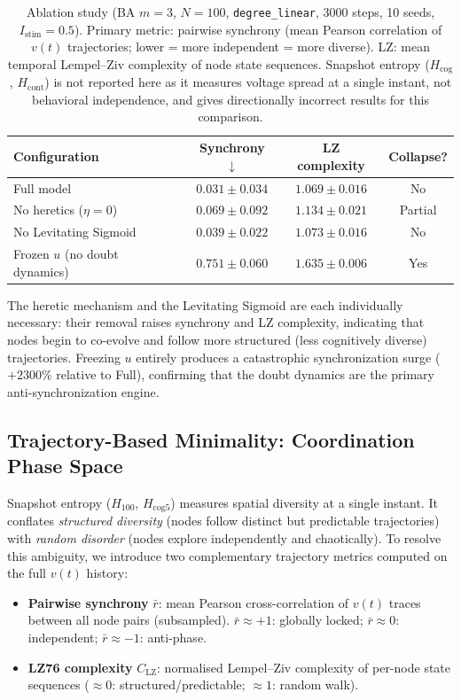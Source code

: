 \documentclass[11pt]{article}
\begin{document}
\begin{table}[ht]
\centering
\caption{Ablation study (BA $m=3$, $N=100$, \texttt{degree\_linear}, 3000 steps, 10 seeds, $I_\mathrm{stim}=0.5$). Primary metric: pairwise synchrony (mean Pearson correlation of $v(t)$ trajectories; lower = more independent = more diverse). LZ: mean temporal Lempel--Ziv complexity of node state sequences. Snapshot entropy ($H_{\mathrm{cog}}$, $H_{\mathrm{cont}}$) is not reported here as it measures voltage spread at a single instant, not behavioral independence, and gives directionally incorrect results for this comparison.}
\label{tab:ablations}
\begin{tabular}{lccc}
\toprule
\textbf{Configuration} & \textbf{Synchrony} $\downarrow$ & \textbf{LZ complexity} & \textbf{Collapse?} \\
\midrule
Full model                     & $0.031 \pm 0.034$ & $1.069 \pm 0.016$ & No \\
No heretics ($\eta = 0$)       & $0.069 \pm 0.092$ & $1.134 \pm 0.021$ & Partial \\
No Levitating Sigmoid          & $0.039 \pm 0.022$ & $1.073 \pm 0.016$ & No \\
Frozen $u$ (no doubt dynamics) & $0.751 \pm 0.060$ & $1.635 \pm 0.006$ & Yes \\
\bottomrule
\end{tabular}
\end{table}

The heretic mechanism and the Levitating Sigmoid are each individually necessary: their removal raises synchrony and LZ complexity, indicating that nodes begin to co-evolve and follow more structured (less cognitively diverse) trajectories. Freezing $u$ entirely produces a catastrophic synchronization surge ($+2300\%$ relative to Full), confirming that the doubt dynamics are the primary anti-synchronization engine.

\subsection{Trajectory-Based Minimality: Coordination Phase Space}
\label{sec:traj_minimality}

Snapshot entropy ($H_{100}$, $H_{\text{cog5}}$) measures spatial diversity at a single instant. It conflates \emph{structured diversity} (nodes follow distinct but predictable trajectories) with \emph{random disorder} (nodes explore independently and chaotically). To resolve this ambiguity, we introduce two complementary trajectory metrics computed on the full $v(t)$ history:
\begin{itemize}
  \item \textbf{Pairwise synchrony} $\bar{r}$: mean Pearson cross-correlation of $v(t)$ traces between all node pairs (subsampled). $\bar{r} \approx +1$: globally locked; $\bar{r} \approx 0$: independent; $\bar{r} \approx -1$: anti-phase.
  \item \textbf{LZ76 complexity} $C_{\text{LZ}}$: normalised Lempel--Ziv complexity of per-node state sequences ($\approx 0$: structured/predictable; $\approx 1$: random walk).
\end{itemize}
\end{document}
